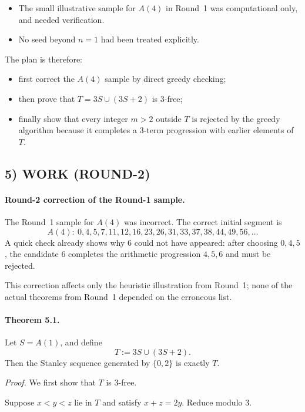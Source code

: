 \begin{itemize}
\item The small illustrative sample for $A(4)$ in Round~1 was computational only, and needed verification.
\item No seed beyond $n=1$ had been treated explicitly.
\end{itemize}

The plan is therefore:

\begin{itemize}
\item first correct the $A(4)$ sample by direct greedy checking;
\item then prove that $T=3S\cup(3S+2)$ is 3-free;
\item finally show that every integer $m>2$ outside $T$ is rejected by the greedy algorithm because it completes a 3-term progression with earlier elements of $T$.
\end{itemize}

\subsection*{5) WORK (ROUND-2)}

\paragraph{Round-2 correction of the Round-1 sample.}
The Round~1 sample for $A(4)$ was incorrect. The correct initial segment is
\[
A(4):\ 0,4,5,7,11,12,16,23,26,31,33,37,38,44,49,56,\dots
\]
A quick check already shows why $6$ could not have appeared: after choosing $0,4,5$, the candidate $6$ completes the arithmetic progression $4,5,6$ and must be rejected.

This correction affects only the heuristic illustration from Round~1; none of the actual theorems from Round~1 depended on the erroneous list.

\paragraph{Theorem 5.1.}
Let $S=A(1)$, and define
\[
T:=3S\cup(3S+2).
\]
Then the Stanley sequence generated by $\{0,2\}$ is exactly $T$.

\emph{Proof.}
We first show that $T$ is 3-free.

Suppose $x<y<z$ lie in $T$ and satisfy $x+z=2y$.
Reduce modulo $3$.

